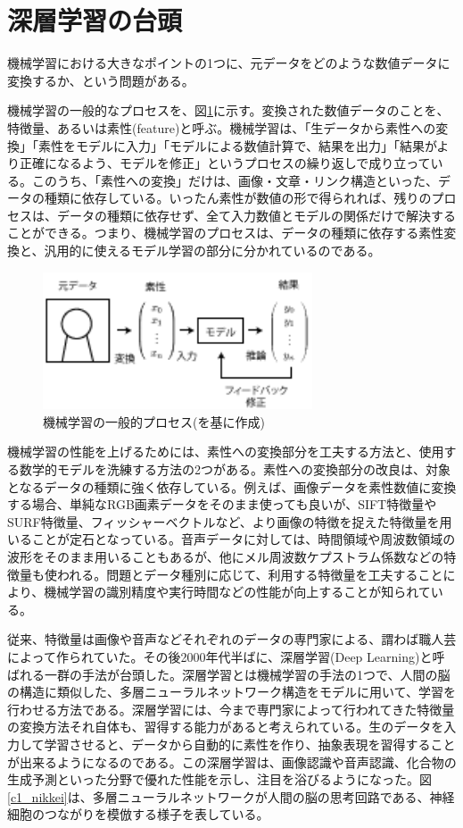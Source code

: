 \section{深層学習の台頭}
機械学習における大きなポイントの1つに、元データをどのような数値データに変換するか、という問題がある。\par
機械学習の一般的なプロセスを、図\ref{c1_ml}に示す。変換された数値データのことを、 特徴量、あるいは素性(feature)と呼ぶ。機械学習は、「生データから素性への変換」「素性をモデルに入力」「モデルによる数値計算で、結果を出力」「結果がより正確になるよう、モデルを修正」というプロセスの繰り返しで成り立っている。このうち、「素性への変換」だけは、画像・文章・リンク構造といった、データの種類に依存している。いったん素性が数値の形で得られれば、残りのプロセスは、データの種類に依存せず、全て入力数値とモデルの関係だけで解決することができる。つまり、機械学習のプロセスは、データの種類に依存する素性変換と、汎用的に使えるモデル学習の部分に分かれているのである。
\begin{figure}[tbp]
 \centering
  \includegraphics[width=80mm]{img/c1/ml}
 \caption{機械学習の一般的プロセス(\cite{bishop2006pattern}を基に作成)}
 \label{c1_ml}
\end{figure}
\par
機械学習の性能を上げるためには、素性への変換部分を工夫する方法と、使用する数学的モデルを洗練する方法の2つがある。素性への変換部分の改良は、対象となるデータの種類に強く依存している。例えば、画像データを素性数値に変換する場合、単純なRGB画素データをそのまま使っても良いが、SIFT特徴量\cite{lowe1999object}やSURF特徴量\cite{bay2008speeded-up}、フィッシャーベクトル\cite{perronnin2007fisher}など、より画像の特徴を捉えた特徴量を用いることが定石となっている。音声データに対しては、時間領域や周波数領域の波形をそのまま用いることもあるが、他にメル周波数ケプストラム係数などの特徴量も使われる\cite{logan2000mel-frequency}。問題とデータ種別に応じて、利用する特徴量を工夫することにより、機械学習の識別精度や実行時間などの性能が向上することが知られている。\par
従来、特徴量は画像や音声などそれぞれのデータの専門家による、謂わば職人芸によって作られていた。その後2000年代半ばに、深層学習(Deep Learning)と呼ばれる一群の手法が台頭した。深層学習とは機械学習の手法の1つで、人間の脳の構造に類似した、多層ニューラルネットワーク構造をモデルに用いて、学習を行わせる方法である。深層学習には、今まで専門家によって行われてきた特徴量の変換方法それ自体も、習得する能力があると考えられている。生のデータを入力して学習させると、データから自動的に素性を作り、抽象表現を習得することが出来るようになるのである。この深層学習は、画像認識や音声認識、化合物の生成予測といった分野で優れた性能を示し、注目を浴びるようになった。図\ref{c1_nikkei}は、多層ニューラルネットワークが人間の脳の思考回路である、神経細胞のつながりを模倣する様子を表している。\par
